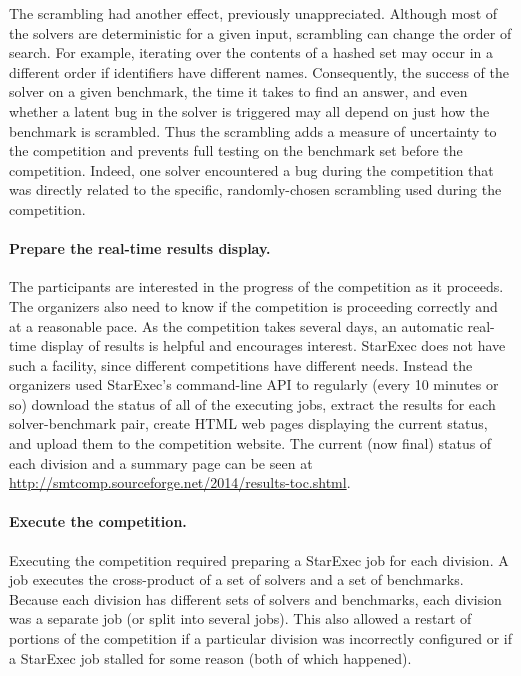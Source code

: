 \documentclass[twoside,11pt]{article}
\begin{document}
The scrambling had another effect, previously unappreciated. Although most of the solvers are deterministic for a given input, scrambling can change the order of search. For example, iterating over the contents of a hashed set may occur in a different order if identifiers have different names. Consequently, the success of the solver on a given benchmark, the time it takes to find an answer, and even whether a latent bug in the solver is triggered may all depend on just how the benchmark is scrambled. Thus the scrambling adds a measure of uncertainty to the competition and prevents full testing on the benchmark set before the competition. Indeed, one solver encountered a bug during the competition that was directly related to the specific, randomly-chosen scrambling used during the competition.

\paragraph{Prepare the real-time results display.} The participants are interested in the progress of the competition as it proceeds. The organizers also need to know if the competition is proceeding correctly and at a reasonable pace. As the competition takes several days, an automatic real-time display of results is helpful and encourages interest.  StarExec does not have such a facility, since different competitions have different needs. Instead the organizers used StarExec's command-line API to regularly (every 10 minutes or so) download the status of all of the executing jobs, extract the results for each solver-benchmark pair, create HTML web pages displaying the current status, and upload them to the competition website. The current (now final) status of each division and a summary page can be seen at \url{http://smtcomp.sourceforge.net/2014/results-toc.shtml}.

\paragraph{Execute the competition.} Executing the competition required preparing a StarExec job for each 
division. A job executes the cross-product of a set of solvers and a set of benchmarks. Because each division has different sets of solvers and benchmarks, each division was a separate job (or split into several jobs). This also allowed a restart of portions of the competition if a particular division was incorrectly configured or if a StarExec job stalled for some reason (both of which happened).
\end{document}

